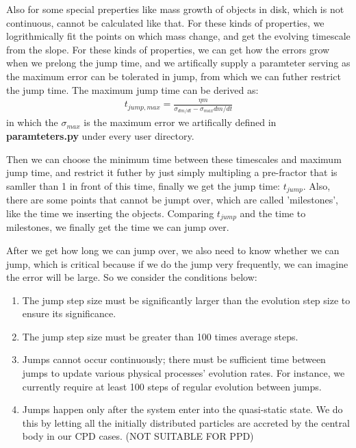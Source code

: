 \documentclass[12pt]{article}
\begin{document}
Also for some special preperties like mass growth of objects in disk, which is not 
continuous, cannot be calculated like that. For these kinds of properties, we 
logrithmically fit the points on which mass change, and get the evolving timescale 
from the slope. For these kinds of properties, we can get how the errors grow  
when we prelong the jump time, and we artifically supply a paramteter serving as 
the maximum error can be tolerated in jump, from which we can futher restrict the
jump time. The maximum jump time can be derived as:
\begin{align}
    t_{jump,max} = \frac{\eta m}{\sigma_{dm/dt} - \sigma_{max} dm/dt}
\end{align}
in which the $\sigma_{max}$ is the maximum error we artifically defined in 
\textbf{paramteters.py} under every user directory.

Then we can choose the minimum time between these timescales and maximum jump 
time, and restrict it futher by just simply multipling a pre-fractor that is 
samller than 1 in front 
of this time, finally we get the jump time: $t_{jump}$. Also, there are some 
points that cannot be jumpt over, which are called 'milestones', like the time 
we inserting the objects. Comparing $t_{jump}$ and the time to milestones, 
we finally get the time we can jump over. 

After we get how long we can jump over, we also need to know whether we can jump, 
which is critical because if we do the jump very frequently, we can imagine the 
error will be large. So we consider the conditions below:
\begin{enumerate}
    \item The jump step size must be significantly larger than the evolution step size to 
        ensure its significance.
    \item The jump step size must be greater than 100 times average steps.
    \item Jumps cannot occur continuously; there must be sufficient time between jumps to 
        update various physical processes’ evolution rates. For instance, we currently 
        require at least 100 steps of regular evolution between jumps.
    \item Jumps happen only after the system enter into the quasi-static state. We 
        do this by letting all the initially distributed particles are accreted 
        by the central body in our CPD cases. (NOT SUITABLE FOR PPD)
\end{enumerate}
\end{document}
